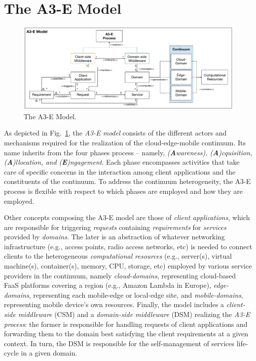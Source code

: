 \section{The A3-E Model}\label{sec:proposal}

\begin{figure}[tbp]
	\includegraphics[width=1\textwidth]{figs/A3-E-model.pdf}
	\caption{The A3-E Model.}
	\label{fig:A3-E-model}
\end{figure}

As depicted in Fig.~\ref{fig:A3-E-model}, the \textit{A3-E model} consists of the different actors and mechanisms required for the realization of the cloud-edge-mobile continuum. Its name inherits from the four phases process -- namely, \textit{(\textbf{A}wareness), (\textbf{A})cquisition, (\textbf{A})llocation, and (\textbf{E})ngagement}. Each phase encompasses activities that take care of specific concerns in the interaction among client applications and the constituents of the continuum. To address the continuum heterogeneity, the A3-E process is flexible with respect to which phases are employed and how they are employed.

Other concepts composing the A3-E model are those of \textit{client applications}, which are responsible for triggering \textit{requests} containing \textit{requirements} for  \textit{services} provided by \textit{domains}. The later is an abstraction of whatever networking infrastructure (e.g., access points, radio access networks, etc) is needed to connect clients to the heterogeneous \textit{computational resources} (e.g., server(s), virtual machine(s), container(s), memory, CPU, storage, etc) employed by various service providers in the continuum, namely \textit{cloud-domains}, representing cloud-based FaaS platforms covering a region (e.g., Amazon Lambda in Europe), \textit{edge-domains}, representing each mobile-edge or local-edge site, and \textit{mobile-domains}, representing mobile device's own resources.
Finally, the model includes a \textit{client-side middleware} (CSM) and a \textit{domain-side middleware} (DSM) realizing the \textit{A3-E process}: the former is responsible for handling requests of client applications and forwarding them to the domain best satisfying the client requirements at a given context. In turn, the DSM is responsible for the self-management of services life-cycle in a given domain. 

